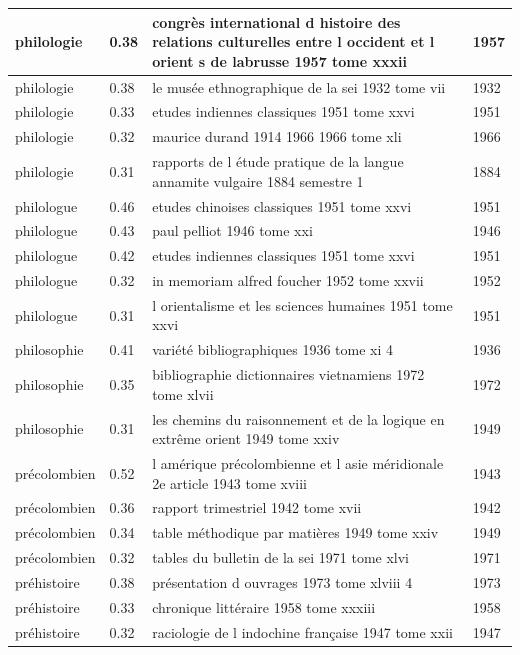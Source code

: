 \begin{longtable}{|p{3cm}|p{1cm}|p{10cm}|p{1cm}|}
philologie & 0.38 & congrès international d histoire des relations culturelles entre l occident et l orient s de labrusse 1957 tome xxxii & 1957  \\ \hline
philologie & 0.38 & le musée ethnographique de la sei 1932 tome vii & 1932  \\ \hline
philologie & 0.33 & etudes indiennes classiques 1951 tome xxvi & 1951  \\ \hline
philologie & 0.32 & maurice durand 1914 1966 1966 tome xli & 1966  \\ \hline
philologie & 0.31 & rapports de l étude pratique de la langue annamite vulgaire 1884 semestre 1 & 1884  \\ \hline
philologue & 0.46 & etudes chinoises classiques 1951 tome xxvi & 1951  \\ \hline
philologue & 0.43 & paul pelliot 1946 tome xxi & 1946  \\ \hline
philologue & 0.42 & etudes indiennes classiques 1951 tome xxvi & 1951  \\ \hline
philologue & 0.32 & in memoriam alfred foucher 1952 tome xxvii & 1952  \\ \hline
philologue & 0.31 & l orientalisme et les sciences humaines 1951 tome xxvi & 1951  \\ \hline
philosophie & 0.41 & variété bibliographiques 1936 tome xi 4 & 1936  \\ \hline
philosophie & 0.35 & bibliographie dictionnaires vietnamiens 1972 tome xlvii & 1972  \\ \hline
philosophie & 0.31 & les chemins du raisonnement et de la logique en extrême orient 1949 tome xxiv & 1949  \\ \hline
précolombien & 0.52 & l amérique précolombienne et l asie méridionale 2e article 1943 tome xviii & 1943  \\ \hline
précolombien & 0.36 & rapport trimestriel 1942 tome xvii & 1942  \\ \hline
précolombien & 0.34 & table méthodique par matières 1949 tome xxiv & 1949  \\ \hline
précolombien & 0.32 & tables du bulletin de la sei 1971 tome xlvi & 1971  \\ \hline
préhistoire & 0.38 & présentation d ouvrages 1973 tome xlviii 4 & 1973  \\ \hline
préhistoire & 0.33 & chronique littéraire 1958 tome xxxiii & 1958  \\ \hline
préhistoire & 0.32 & raciologie de l indochine française 1947 tome xxii & 1947  \\ \hline

\end{longtable}
